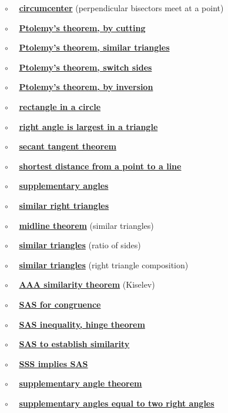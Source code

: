 \documentclass[11pt, oneside]{article}
\begin{document}
$\circ$ \ \ \hyperref[sec:circumcenter]{\textbf{circumcenter}} (perpendicular bisectors meet at a point)

$\circ$ \ \ \hyperref[sec:Ptolemy]{\textbf{Ptolemy's theorem, by cutting}}

$\circ$ \ \ \hyperref[sec:Ptolemy_similar_triangles]{\textbf{Ptolemy's theorem, similar triangles}}

$\circ$ \ \ \hyperref[sec:Ptolemy_switch_sides]{\textbf{Ptolemy's theorem, switch sides}}

$\circ$ \ \ \hyperref[sec:Ptolemy_inversion]{\textbf{Ptolemy's theorem, by inversion}}

$\circ$ \ \ \hyperref[sec:rectangle_side_on_a_circle]{\textbf{rectangle in a circle}}

$\circ$ \ \ \hyperref[sec:right_angle_largest]{\textbf{right angle is largest in a triangle}}

$\circ$ \ \ \hyperref[sec:secant_tangent_theorem]{\textbf{secant tangent theorem}}

$\circ$ \ \ \hyperref[sec:shortest_distance_to_line]{\textbf{shortest distance from a point to a line}}

$\circ$ \ \ \hyperref[sec:equal_supplementary_angles]{\textbf{supplementary angles}}

$\circ$ \ \ \hyperref[sec:similar_right_triangles]{\textbf{similar right triangles}}

$\circ$ \ \ \hyperref[sec:midline_theorem]{\textbf{midline theorem}} (similar triangles)

$\circ$ \ \  \hyperref[sec:similarity_equal_ratios]{\textbf{similar triangles}} (ratio of sides)

$\circ$ \ \  \hyperref[sec:similarity_right_to_all_triangles]{\textbf{similar triangles}} (right triangle composition)

$\circ$ \ \ \hyperref[sec:similarity_theorem]{\textbf{AAA similarity theorem}} (Kiselev)

$\circ$ \ \ \hyperref[sec:SAS]{\textbf{SAS for congruence}}

$\circ$ \ \ \hyperref[sec:hinge_theorem]{\textbf{SAS inequality, hinge theorem}}

$\circ$ \ \ \hyperref[sec:SAS_similar]{\textbf{SAS to establish similarity}}

$\circ$ \ \ \hyperref[sec:SSS_implies_SAS]{\textbf{SSS implies SAS}}

$\circ$ \ \ \hyperref[sec:supplementary_angle_theorem]{\textbf{supplementary angle theorem}}

$\circ$ \ \ \hyperref[sec:two_supplementary_equal_two_right]{\textbf{supplementary angles equal to two right angles}}
\end{document}
